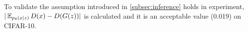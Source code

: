 To validate the assumption introduced in \cref{subsec:inference} holds in  experiment, $|\operatorname{\mathbb{E}}_{p_\theta(x|z)}D(x) - D(G(z))|$ is calculated and it is an acceptable value (0.019) on CIFAR-10. 





